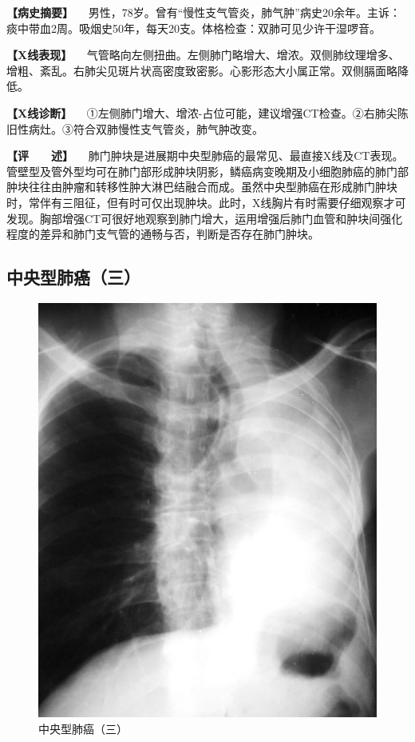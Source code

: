 \textbf{【病史摘要】}
　男性，78岁。曾有“慢性支气管炎，肺气肿”病史20余年。主诉：痰中带血2周。吸烟史50年，每天20支。体格检查：双肺可见少许干湿啰音。

\textbf{【X线表现】}
　气管略向左侧扭曲。左侧肺门略增大、增浓。双侧肺纹理增多、增粗、紊乱。右肺尖见斑片状高密度致密影。心影形态大小属正常。双侧膈面略降低。

\textbf{【X线诊断】}
　①左侧肺门增大、增浓-占位可能，建议增强CT检查。②右肺尖陈旧性病灶。③符合双肺慢性支气管炎，肺气肿改变。

\textbf{【评　　述】}
　肺门肿块是进展期中央型肺癌的最常见、最直接X线及CT表现。管壁型及管外型均可在肺门部形成肿块阴影，鳞癌病变晚期及小细胞肺癌的肺门部肿块往往由肿瘤和转移性肿大淋巴结融合而成。虽然中央型肺癌在形成肺门肿块时，常伴有三阻征，但有时可仅出现肿块。此时，X线胸片有时需要仔细观察才可发现。胸部增强CT可很好地观察到肺门增大，运用增强后肺门血管和肿块间强化程度的差异和肺门支气管的通畅与否，判断是否存在肺门肿块。

\subsection{中央型肺癌（三）}

\begin{figure}[!htbp]
 \centering
 \includegraphics{./images/Image00165.jpg}
 \captionsetup{justification=centering}
 \caption{中央型肺癌（三）}
 \label{fig3-8-3}
  \end{figure} 

